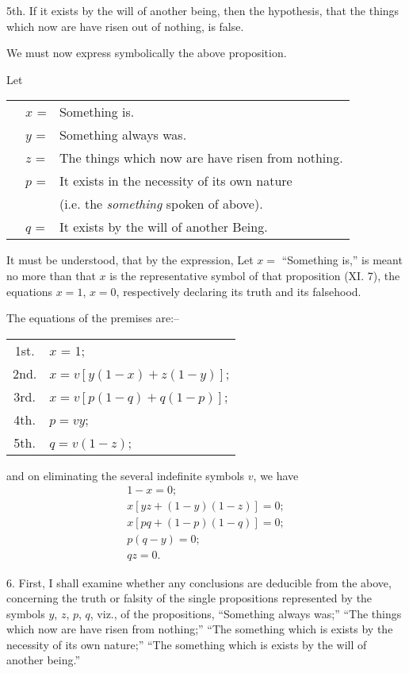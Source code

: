 \documentclass[oneside]{book}
\begin{document}
5th. If it exists by the will of another being, then the hypothesis,
that the things which now are have risen out of nothing,
is false.

We must now express symbolically the above proposition.

Let \\
\begin{tabular}{c l l}
&$x$ = &Something is.\\
&$y$ = &Something always was.\\
&$z$ = &The things which now are have risen from nothing.\\
&$p$ = &It exists in the necessity of its own nature \\
& &(i.e. the \textit{something} spoken of above).\\
&$q$ = &It exists by the will of another Being.
\end{tabular}

It must be understood, that by the expression, Let $x =$
``Something is,'' is meant no more than that $x$ is the representative
symbol of that proposition (XI. 7), the equations
$x = 1$, $x = 0$, respectively declaring its truth and its falsehood.

The equations of the premises are:-- \\
\begin{tabular}{c l}
1st. &$x$ = 1;\\
2nd. &$x=v[y(1-x)+z(1-y)]$;\\
3rd. &$x=v[p(1-q)+q(1-p)]$;\\
4th. &$p=vy$;\\
5th. &$q=v(1-z)$;
\end{tabular}

and on eliminating the several indefinite symbols $v$, we have \\
\begin{eqnarray}
1-x=0;\\
x[yz+(1-y)(1-z)]=0;\\
x[pq+(1-p)(1-q)]=0;\\
p(q-y)=0;\\
qz=0.
\end{eqnarray}

6. First, I shall examine whether any conclusions are deducible
from the above, concerning the truth or falsity of the
single propositions represented by the symbols $y$, $z$, $p$, $q$, viz., of
the propositions, ``Something always was;'' ``The things which
now are have risen from nothing;'' ``The something which is
exists by the necessity of its own nature;'' ``The something
which is exists by the will of another being.''
\end{document}
